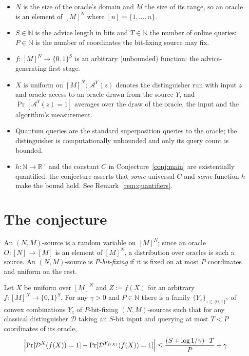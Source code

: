 \documentclass{conjura-conjecture}
\newcommand{\Adv}{\mathcal{A}}
\newcommand{\Dist}{\mathcal{D}}
\newcommand{\Prb}{\Pr}
\newcommand{\bits}{\{0,1\}}
\begin{document}
\begin{itemize}
\item $N$ is the size of the oracle's domain and $M$ the size of its
  range, so an oracle is an element of $[M]^{N}$ where $[n] =
  \{1,\dots,n\}$.
\item $S \in \mathbb{N}$ is the advice length in bits and $T \in
  \mathbb{N}$ the number of online queries; $P \in \mathbb{N}$ is the
  number of coordinates the bit-fixing source may fix.
\item $f : [M]^{N} \to \bits^{S}$ is an arbitrary (unbounded)
  function: the advice-generating first stage.
\item $X$ is uniform on $[M]^{N}$; $\Adv^{Y}(z)$ denotes the
  distinguisher run with input $z$ and oracle access to an oracle drawn
  from the source $Y$, and $\Prb[\Adv^{Y}(z) = 1]$ averages over the
  draw of the oracle, the input and the algorithm's measurement.
\item Quantum queries are the standard superposition queries to the
  oracle; the distinguisher is computationally unbounded and only its
  query count is bounded.
\item $h : \mathbb{N} \to \mathbb{R}^{+}$ and the constant $C$ in
  Conjecture~\ref{conj:main} are existentially quantified: the
  conjecture asserts that \emph{some} universal $C$ and \emph{some}
  function $h$ make the bound hold. See Remark~\ref{rem:quantifiers}.
\end{itemize}

\section{The conjecture}\label{sec:conjectures}

\begin{definition}\label{def:source}
An $(N,M)$-source is a random variable on $[M]^{N}$; since an oracle
$O : [N] \to [M]$ is an element of $[M]^{N}$, a distribution over
oracles is such a source. An $(N,M)$-source is \emph{$P$-bit-fixing} if
it is fixed on at most $P$ coordinates and uniform on the rest.
\end{definition}

\begin{lemma}\label{lem:classical}
Let $X$ be uniform over $[M]^{N}$ and $Z := f(X)$ for an arbitrary
$f : [M]^{N} \to \bits^{S}$. For any $\gamma > 0$ and $P \in
\mathbb{N}$ there is a family $\{Y_{z}\}_{z \in \bits^{S}}$ of convex
combinations $Y_{z}$ of $P$-bit-fixing $(N,M)$-sources such that for
any classical distinguisher $\Dist$ taking an $S$-bit input and
querying at most $T < P$ coordinates of its oracle,
\[
  \Bigl|\Prb[\Dist^{X}(f(X)) = 1]
  - \Prb[\Dist^{Y_{f(X)}}(f(X)) = 1]\Bigr|
  \le \frac{(S + \log 1/\gamma)\cdot T}{P} + \gamma.
\]
\end{lemma}
\end{document}
